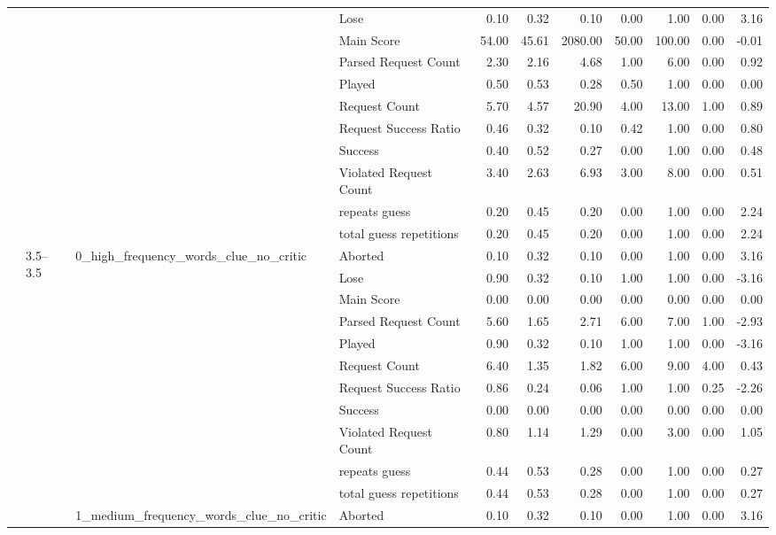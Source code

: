 \begin{tabular}{llllrrrrrrr}
 &  &  & Lose & 0.10 & 0.32 & 0.10 & 0.00 & 1.00 & 0.00 & 3.16 \\
 &  &  & Main Score & 54.00 & 45.61 & 2080.00 & 50.00 & 100.00 & 0.00 & -0.01 \\
 &  &  & Parsed Request Count & 2.30 & 2.16 & 4.68 & 1.00 & 6.00 & 0.00 & 0.92 \\
 &  &  & Played & 0.50 & 0.53 & 0.28 & 0.50 & 1.00 & 0.00 & 0.00 \\
 &  &  & Request Count & 5.70 & 4.57 & 20.90 & 4.00 & 13.00 & 1.00 & 0.89 \\
 &  &  & Request Success Ratio & 0.46 & 0.32 & 0.10 & 0.42 & 1.00 & 0.00 & 0.80 \\
 &  &  & Success & 0.40 & 0.52 & 0.27 & 0.00 & 1.00 & 0.00 & 0.48 \\
 &  &  & Violated Request Count & 3.40 & 2.63 & 6.93 & 3.00 & 8.00 & 0.00 & 0.51 \\
 &  &  & repeats guess & 0.20 & 0.45 & 0.20 & 0.00 & 1.00 & 0.00 & 2.24 \\
 &  &  & total guess repetitions & 0.20 & 0.45 & 0.20 & 0.00 & 1.00 & 0.00 & 2.24 \\
\cline{2-11} \cline{3-11}
 & \multirow[t]{33}{*}{3.5--3.5} & \multirow[t]{11}{*}{0_high_frequency_words_clue_no_critic} & Aborted & 0.10 & 0.32 & 0.10 & 0.00 & 1.00 & 0.00 & 3.16 \\
 &  &  & Lose & 0.90 & 0.32 & 0.10 & 1.00 & 1.00 & 0.00 & -3.16 \\
 &  &  & Main Score & 0.00 & 0.00 & 0.00 & 0.00 & 0.00 & 0.00 & 0.00 \\
 &  &  & Parsed Request Count & 5.60 & 1.65 & 2.71 & 6.00 & 7.00 & 1.00 & -2.93 \\
 &  &  & Played & 0.90 & 0.32 & 0.10 & 1.00 & 1.00 & 0.00 & -3.16 \\
 &  &  & Request Count & 6.40 & 1.35 & 1.82 & 6.00 & 9.00 & 4.00 & 0.43 \\
 &  &  & Request Success Ratio & 0.86 & 0.24 & 0.06 & 1.00 & 1.00 & 0.25 & -2.26 \\
 &  &  & Success & 0.00 & 0.00 & 0.00 & 0.00 & 0.00 & 0.00 & 0.00 \\
 &  &  & Violated Request Count & 0.80 & 1.14 & 1.29 & 0.00 & 3.00 & 0.00 & 1.05 \\
 &  &  & repeats guess & 0.44 & 0.53 & 0.28 & 0.00 & 1.00 & 0.00 & 0.27 \\
 &  &  & total guess repetitions & 0.44 & 0.53 & 0.28 & 0.00 & 1.00 & 0.00 & 0.27 \\
\cline{3-11}
 &  & \multirow[t]{11}{*}{1_medium_frequency_words_clue_no_critic} & Aborted & 0.10 & 0.32 & 0.10 & 0.00 & 1.00 & 0.00 & 3.16 \\

\end{tabular}
